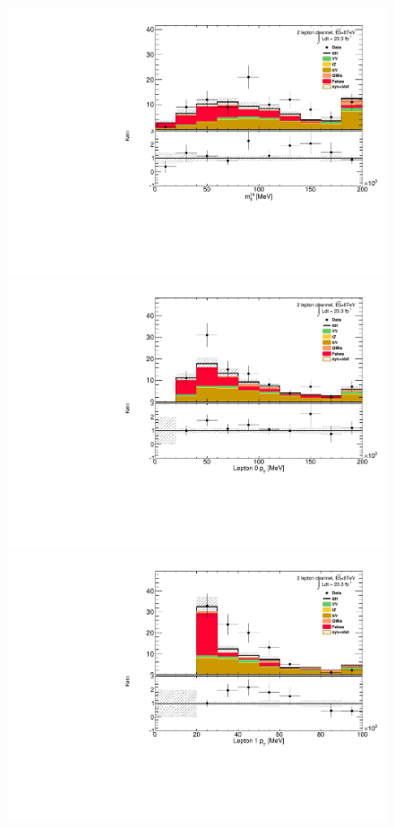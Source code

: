 \begin{figure}[!htbp]
  \begin{minipage}[h]{0.5\textwidth}
    \centering \includegraphics[width=\textwidth]{figs/results/plotCand_2lep_Mll01}
  \end{minipage}\hfill
  \begin{minipage}[h]{0.5\textwidth}
    \centering \includegraphics[width=\textwidth]{figs/results/plotCand_2lep_Lep0Pt}
  \end{minipage}\hfill
  \begin{minipage}[h]{0.5\textwidth}
    \centering \includegraphics[width=\textwidth]{figs/results/plotCand_2lep_Lep1Pt}

\end{minipage}
\end{figure}
